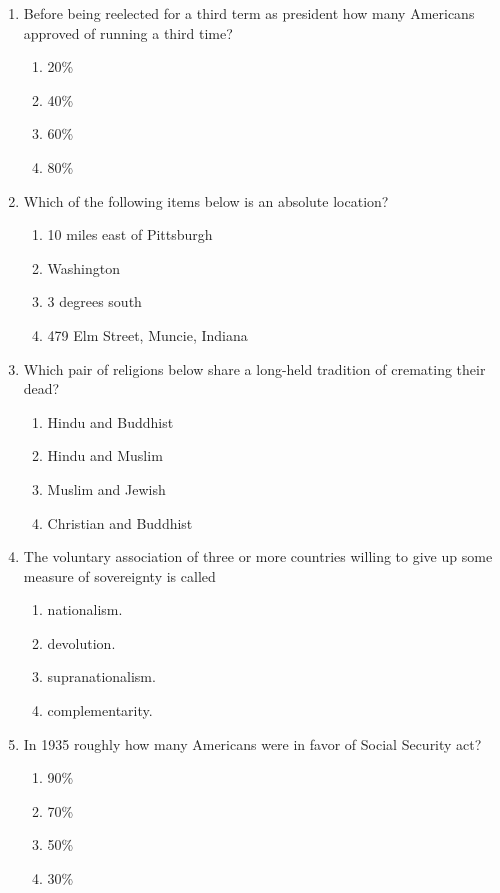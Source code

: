 \documentclass[12pt]{article}
\begin{document}
\begin{enumerate}[label=\arabic*.]
\begin{enumerate}[label=(\alph*)]
    \item Abuja, Nigeria
    \item Paris, France
    \item London, United Kingdom
    \item Cairo, Egypt
\end{enumerate}
\item Before being reelected for a third term as president how many Americans approved of running a third time?
\begin{enumerate}[label=(\alph*)]
    \item 20\%
    \item 40\%
    \item 60\%
    \item 80\%
\end{enumerate}
\item Which of the following items below is an absolute location?
\begin{enumerate}[label=(\alph*)]
    \item 10 miles east of Pittsburgh
    \item Washington
    \item 3 degrees south
    \item 479 Elm Street, Muncie, Indiana
\end{enumerate}
\item Which pair of religions below share a long-held tradition of cremating their dead?
\begin{enumerate}[label=(\alph*)]
    \item Hindu and Buddhist
    \item Hindu and Muslim
    \item Muslim and Jewish
    \item Christian and Buddhist
\end{enumerate}
\item The voluntary association of three or more countries willing to give up some measure of sovereignty is called
\begin{enumerate}[label=(\alph*)]
    \item nationalism.
    \item devolution.
    \item supranationalism.
    \item complementarity.
\end{enumerate}
\item In 1935 roughly how many Americans were in favor of Social Security act?
\begin{enumerate}[label=(\alph*)]
    \item 90\%
    \item 70\%
    \item 50\%
    \item 30\%
\end{enumerate}
\end{enumerate}
\end{document}
